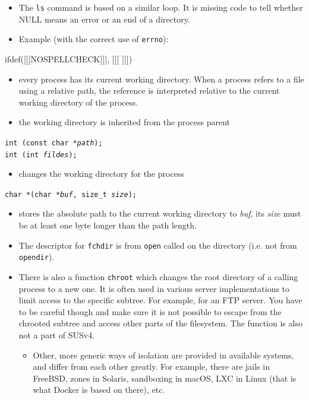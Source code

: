 \begin{itemize}
\item The \texttt{ls} command is based on a similar loop.  It is missing code to
tell whether NULL means an error or an end of a directory.
\item Example (with the correct use of \texttt{errno}):
\end{itemize}


ifdef([[[NOSPELLCHECK]]], [[[
]]])

\begin{slide}
\begin{itemize}
\item every process has its current working directory.  When a process refers to
a file using a relative path, the reference is interpreted relative to the
current working directory of the process.
\item the working directory is inherited from the process parent
\end{itemize}
\texttt{int (const char *\emph{path});}\\
\texttt{int (int \emph{fildes});}
\begin{itemize}
\item changes the working directory for the process
\end{itemize}
\texttt{char *(char *\emph{buf}, size\_t \emph{size});}
\begin{itemize}
\item stores the absolute path to the current working directory to \emph{buf},
its \emph{size} must be at least one byte longer than the path length.
\end{itemize}
\end{slide}

\begin{itemize}
\item The descriptor for \texttt{fchdir} is from \texttt{open} called on the
directory (i.e. not from \texttt{opendir}).
\item There is also a function \texttt{chroot} which changes the root
directory of a calling process to a new one.  It is often used in various server
implementations to limit access to the specific subtree.  For example, for an
FTP server.  You have to be careful though and make sure it is not possible to
escape from the chrooted subtree and access other parts of the filesystem.  The
function is also not a part of SUSv4.
\begin{itemize}
\item Other, more generic ways of isolation are provided in available systems,
and differ from each other greatly.  For example, there are jails in Free\-BSD,
zones in Solaris, sandboxing in macOS, LXC in Linux (that is what Docker is
based on there), etc.  
\end{itemize}
\end{itemize}

